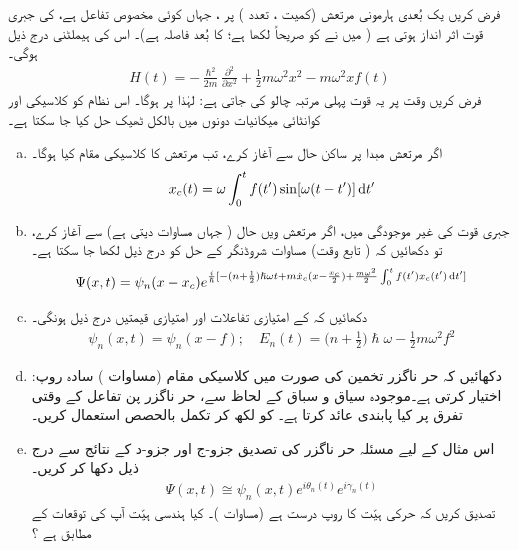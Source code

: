 فرض کریں یک بُعدی ہارمونی مرتعش (کمیت ، تعدد ) پر ، جہاں  کوئی مخصوص تفاعل ہے، کی جبری قوت اثر انداز ہوتی ہے ( میں نے  کو صریحاً لکھا ہے؛  کا بُعد فاصلہ ہے)۔ اس کی ہیملٹنی درج ذیل ہوگی۔
\begin{align}
H(t) = - \frac{\hslash^2}{2m} \frac{\partial^2}{\partial x^2} + \frac{1}{2} m \omega^2 x^2 - m \omega^2 x f (t)
\end{align}
فرض کریں وقت  پر یہ قوت پہلی مرتبہ چالو کی جاتی ہے: لہٰذا  پر  ہوگا۔ اس نظام کو کلاسیکی اور کوانٹائی میکانیات دونوں میں بالکل ٹھیک حل کیا جا سکتا ہے۔ 
\begin{enumerate}[a.]
\item
اگر مرتعش مبدا پر ساکن حال  سے آغاز کرے، تب مرتعش کا کلاسیکی مقام کیا ہوگا۔  
\begin{align}\label{مساوات_حر_کلاسیکی_مقام}
x_c (t) = \omega \int_0^{t} f(t') \sin [\omega (t - t')] \dif t'
\end{align}
\item
جبری قوت کی غیر موجودگی میں، اگر مرتعش  ویں حال (  جہاں  مساوات  دیتی ہے) سے آغاز کرے، تو دکھائیں کہ ( تابع وقت) مساوات شروڈنگر کے حل کو درج ذیل لکھا جا سکتا ہے۔ 
\begin{align}
\Psi (x, t) = \psi_n (x - x_c) e^{\frac{i}{\hslash} [- (n + \frac{1}{2}) \hslash \omega t + m \dot{x}_c (x - \frac{x_c}{2}) + \frac{m \omega^2}{2} \int_0^t f (t') x_c (t') \dif t']}
\end{align}
\item
دکھائیں کہ  کے امتیازی تفاعلات اور امتیازی قیمتیں درج ذیل ہونگی۔ 
\begin{align}
\psi_n (x, t) = \psi_n (x - f); \quad E_n (t) = \big ( n + \frac{1}{2} \big ) \hslash \omega - \frac{1}{2} m \omega^2 f^2
\end{align}
\item
دکھائیں کہ حر ناگزر تخمین کی صورت میں کلاسیکی مقام (مساوات ) سادہ روپ:  اختیار کرتی ہے۔موجودہ سیاق و سباق کے لحاظ سے، حر ناگزر پن تفاعل  کے وقتی تفرق پر کیا پابندی عائد کرتا ہے۔   کو  لکھ کر تکمل بالحصص استعمال کریں۔
\item
اس مثال کے لیے مسئلہ حر ناگزر کی تصدیق جزو-ج اور جزو-د کے نتائج سے درج ذیل دکھا کر کریں۔
\begin{align}
\Psi (x, t) \cong \psi_n (x, t) e^{i \theta_n (t)} e^{i \gamma_n (t)}
\end{align}
تصدیق کریں کہ حرکی ہیّت کا روپ درست ہے (مساوات )۔ کیا ہندسی ہیّت آپ کی توقعات کے مطابق ہے ؟
\end{enumerate}
